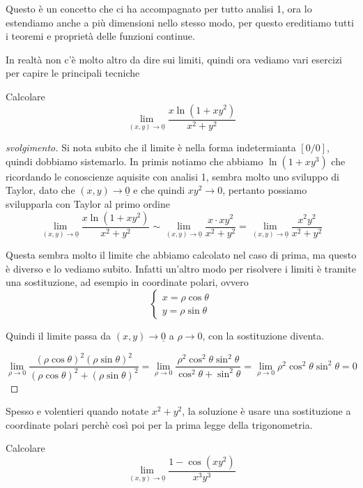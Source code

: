 \documentclass{rapport}
\begin{document}
Questo è un concetto che ci ha accompagnato per tutto analisi 1, ora lo estendiamo anche a più dimensioni nello stesso modo, per questo ereditiamo tutti i teoremi e proprietà delle funzioni continue.

In realtà non c'è molto altro da dire sui limiti, quindi ora vediamo vari esercizi per capire le principali tecniche


\begin{esercizio}{}{}
Calcolare 
\[
\lim_{(x,y) \to \underline{0}} \dfrac{x\ln(1+xy^2)}{x^2+y^2}
\]
\end{esercizio}
\begin{proof}[svolgimento]
  
Si nota subito che il limite è nella forma indetermianta $[0/0]$, quindi dobbiamo sistemarlo. In primis notiamo che abbiamo $\ln(1+xy^3)$ che ricordando le conoscienze aquisite con analisi 1, sembra molto uno sviluppo di Taylor, dato che $(x,y) \to \underline{0}$ e che quindi $xy^2 \to 0$, pertanto possiamo svilupparla con Taylor al primo ordine 
\[
\lim_{(x,y) \to \underline{0}} \dfrac{x\ln(1+xy^2)}{x^2+y^2} \sim \lim_{(x,y) \to \underline{0}} \dfrac{x\cdot xy^2}{x^2+y^2} =  \lim_{(x,y) \to \underline{0}} \dfrac{x^2y^2}{x^2+y^2}  
\]

Questa sembra molto il limite che abbiamo calcolato nel caso di prima, ma questo è diverso e lo vediamo subito. Infatti un'altro modo per risolvere i limiti è tramite una sostituzione, ad esempio in coordinate polari, ovvero 
\[
\begin{cases*}
  x = \rho \cos\theta      \\
  y = \rho \sin\theta 
\end{cases*} 
\]

Quindi il limite passa da $(x,y)\to \underline{0}$ a $\rho\to 0$, con la sostituzione diventa.

\[
\lim_{\rho \to 0} \dfrac{(\rho\cos\theta)^2(\rho\sin\theta)^2}{(\rho\cos\theta)^2+(\rho\sin\theta)^2}  = \lim_{\rho \to 0} \dfrac{\rho^2\cos^2\theta\sin^2\theta}{\cos^2\theta + \sin^2\theta} = \lim_{\rho \to 0} \rho^2\cos^2\theta\sin^2\theta = 0
\]
\end{proof}

Spesso e volentieri quando notate $x^2+y^2$, la soluzione è usare una sostituzione a coordinate polari perchè così poi per la prima legge della trigonometria. 

\begin{esercizio}{}{}
  Calcolare 
  \[
  \lim_{(x,y) \to \underline{0}} \dfrac{1-\cos(xy^2)}{x^3y^3}
  \]
\end{esercizio}
\end{document}
